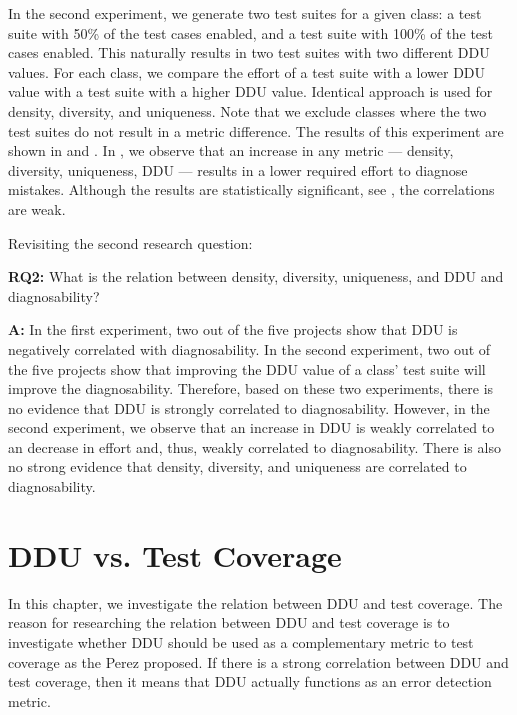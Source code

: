 \documentclass[twoside,a4paper,11pt]{memoir}
\begin{document}
In the second experiment, we generate two test suites for a given class: a test suite with 50\% of the test cases enabled, and a test suite with 100\% of the test cases enabled.
This naturally results in two test suites with two different DDU values.
For each class, we compare the effort of a test suite with a lower DDU value with a test suite with a higher DDU value.
Identical approach is used for density, diversity, and uniqueness.
Note that we exclude classes where the two test suites do not result in a metric difference.
The results of this experiment are shown in  and .
In , we observe that an increase in any metric --- density, diversity, uniqueness, DDU --- results in a lower required effort to diagnose mistakes.
Although the results are statistically significant, see , the correlations are weak.

Revisiting the second research question:
\begin{framed}
\noindent
\textbf{RQ2:} What is the relation between density, diversity, uniqueness, and DDU and diagnosability?
\end{framed}
\textbf{A:} In the first experiment, two out of the five projects show that DDU is negatively correlated with diagnosability.
In the second experiment, two out of the five projects show that improving the DDU value of a class' test suite will improve the diagnosability.
Therefore, based on these two experiments, there is no evidence that DDU is strongly correlated to diagnosability.
However, in the second experiment, we observe that an increase in DDU is weakly correlated to an decrease in effort and, thus, weakly correlated to diagnosability.
There is also no strong evidence that density, diversity, and uniqueness are correlated to diagnosability.

\chapter{DDU vs. Test Coverage}
\label{ch:rq3}
In this chapter, we investigate the relation between DDU and test coverage.
The reason for researching the relation between DDU and test coverage is to investigate whether DDU should be used as a complementary metric to test coverage as the Perez \etal proposed.
If there is a strong correlation between DDU and test coverage, then it means that DDU actually functions as an error detection metric.
\end{document}
